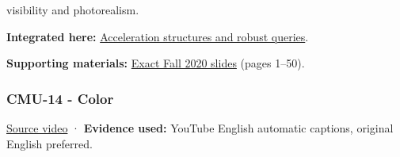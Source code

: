 visibility and photorealism.

\textbf{Integrated here:} \hyperref[04-visual-computing-ii-ch029-acceleration-structures-and-robust-queries-1]{Acceleration structures and robust queries}.

\textbf{Supporting materials:} \href{https://15462.courses.cs.cmu.edu/fall2020content/lectures/13_spatialdatastructures/13_spatialdatastructures_slides.pdf}{Exact Fall 2020 slides} (pages 1--50).

\subsubsection{CMU-14 - Color}\label{04-visual-computing-ii-ch036-cmu-14---color}

\href{https://www.youtube.com/watch?v=77WBg0Mprt0}{Source video} · \textbf{Evidence used:} YouTube English automatic captions, original English preferred.

